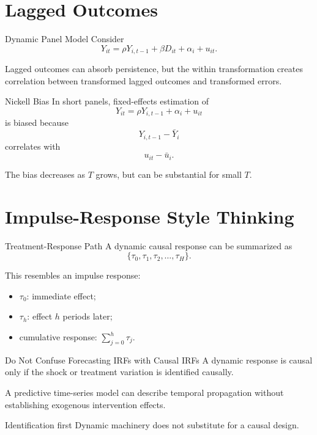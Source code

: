 \documentclass[aspectratio=169,11pt]{beamer}
\begin{document}
\section{Lagged Outcomes}

\begin{frame}{Dynamic Panel Model}
Consider
\[
Y_{it}
=
\rho Y_{i,t-1}
+
\beta D_{it}
+
\alpha_i
+
u_{it}.
\]

Lagged outcomes can absorb persistence, but the within transformation creates correlation between transformed lagged outcomes and transformed errors.
\end{frame}

\begin{frame}{Nickell Bias}
In short panels, fixed-effects estimation of
\[
Y_{it}=\rho Y_{i,t-1}+\alpha_i+u_{it}
\]
is biased because
\[
Y_{i,t-1}-\bar Y_i
\]
correlates with
\[
u_{it}-\bar u_i.
\]

The bias decreases as \(T\) grows, but can be substantial for small \(T\).
\end{frame}

\section{Impulse-Response Style Thinking}

\begin{frame}{Treatment-Response Path}
A dynamic causal response can be summarized as
\[
\{\tau_0,\tau_1,\tau_2,\ldots,\tau_H\}.
\]

This resembles an impulse response:
\begin{itemize}
\item \(\tau_0\): immediate effect;
\item \(\tau_h\): effect \(h\) periods later;
\item cumulative response: \(\sum_{j=0}^{h}\tau_j\).
\end{itemize}
\end{frame}

\begin{frame}{Do Not Confuse Forecasting IRFs with Causal IRFs}
A dynamic response is causal only if the shock or treatment variation is identified causally.

A predictive time-series model can describe temporal propagation without establishing exogenous intervention effects.

\begin{alertblock}{Identification first}
Dynamic machinery does not substitute for a causal design.
\end{alertblock}
\end{frame}
\end{document}
